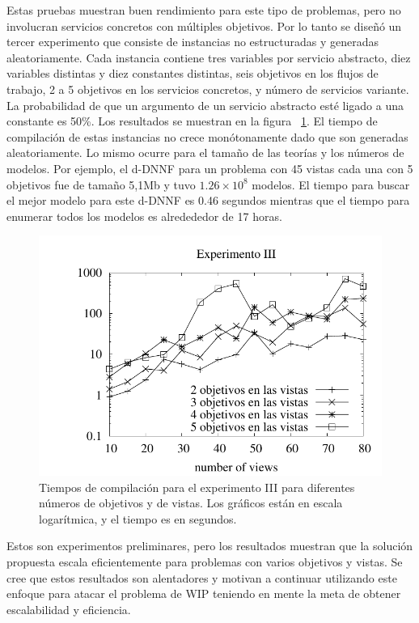 Estas pruebas muestran buen rendimiento para este tipo de problemas, pero no
involucran servicios concretos con múltiples objetivos. Por lo tanto se
diseñó un tercer experimento que consiste de instancias no estructuradas y
generadas aleatoriamente. Cada instancia contiene tres variables por servicio
abstracto, diez variables distintas y diez constantes distintas, seis
objetivos en los flujos de trabajo, 2 a 5 objetivos en los servicios
concretos, y número de servicios variante. La probabilidad de que un argumento
de un servicio abstracto esté ligado a una constante es 50\%. Los resultados se
muestran en la figura ~\ref{fig:plot3}. El tiempo de compilación de estas instancias no
crece monótonamente dado que son generadas aleatoriamente. Lo mismo ocurre para
el tamaño de las teorías y los números de modelos. Por ejemplo, el d-DNNF para
un problema con 45 vistas cada una con 5 objetivos fue de tamaño 5,1Mb y tuvo
$1.26\times 10^8$ modelos. El tiempo para buscar el mejor modelo para este
d-DNNF es 0.46 segundos mientras que el tiempo para enumerar todos los modelos
es alredededor de 17 horas.

\begin{figure}[t]
\centering
\includegraphics[width=.8\textwidth]{graphics/plot3}
\caption{Tiempos de compilación para el experimento III para diferentes números
de objetivos y de vistas. Los gráficos están en escala logarítmica, y el
tiempo es en segundos.}
\label{fig:plot3}
\end{figure}

Estos son experimentos preliminares, pero los resultados muestran que la
solución propuesta escala eficientemente para problemas con varios objetivos
y vistas. Se cree que estos resultados son alentadores y motivan a continuar
utilizando este enfoque para atacar el problema de WIP teniendo en mente la meta
de obtener escalabilidad y eficiencia.

